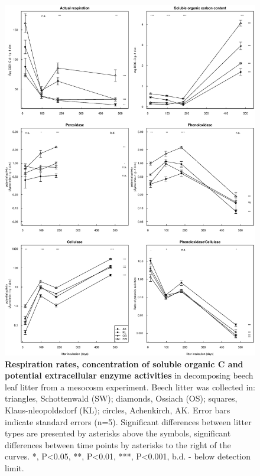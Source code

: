 \documentclass[10pt]{article}
\begin{document}
\begin{flushleft}
\newpage
\begin{figure}[!ht]
\begin{center}
\includegraphics{ligpaper-enz}
\end{center}
\caption{
{\bf Respiration rates, concentration of soluble organic C and potential extracellular enzyme activities} in decomposing beech leaf litter from a mesocosm experiment. Beech litter was collected in: triangles, Schottenwald (SW); diamonds, Ossiach (OS); squares, Klaus-nleopoldsdorf (KL); circles, Achenkirch, AK. Error bars indicate standard errors (n=5). Significant differences between litter types are presented by asterisks above the symbols, significant differences between time points by asterisks to the right of the curves. *, P\textless 0.05, **, P\textless 0.01, ***, P\textless 0.001, b.d. - below detection limit.}
\label{fig:enz}
\end{figure}


\end{flushleft}
\end{document}
